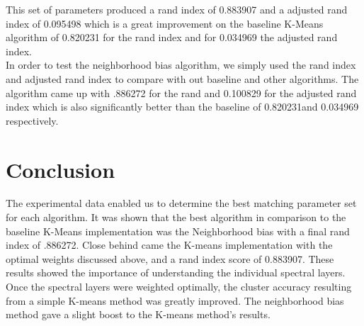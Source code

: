 \documentclass[journal]{IEEEtran}
\begin{document}
  This set of parameters produced a rand index of 0.883907 and a adjusted rand index of 0.095498 which is a great improvement on the baseline K-Means algorithm of 0.820231 for the rand index and for 0.034969 the adjusted rand index.\\

  In order to test the neighborhood bias algorithm, we simply used the rand index and adjusted rand index to compare with out baseline and other algorithms. The algorithm came up with .886272 for the rand and 0.100829 for the adjusted rand index which is also significantly better than the baseline of 0.820231and 0.034969 respectively.\\

\section{Conclusion}
  The experimental data enabled us to determine the best matching parameter set for each algorithm. It was shown that the best algorithm in comparison to the baseline K-Means implementation was the Neighborhood bias with a final rand index of .886272. Close behind came the K-means implementation with the optimal weights discussed above, and a rand index score of 0.883907. These results showed the importance of understanding the individual spectral layers. Once the spectral layers were weighted optimally, the cluster accuracy resulting from a simple K-means method was greatly improved. The neighborhood bias method gave a slight boost to the K-means method’s results.\\


\ifCLASSOPTIONcaptionsoff
  \newpage
\fi
\end{document}
